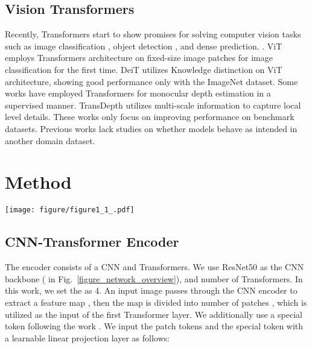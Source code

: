 \documentclass[letterpaper]{article} \usepackage{aaai23}  \usepackage{times}  \usepackage{helvet}  \usepackage{courier}  \usepackage[hyphens]{url}  \usepackage{graphicx} \urlstyle{rm} \def\UrlFont{\rm}  \usepackage{natbib}  \usepackage{caption} \frenchspacing  \setlength{\pdfpagewidth}{8.5in} \setlength{\pdfpageheight}{11in} \usepackage{algorithm}
\newcommand{\figref}[1]{Fig.~\ref{#1}}
\begin{document}
\subsection{Vision Transformers}
Recently, Transformers \cite{vaswani2017attention} start to show promises for solving computer vision tasks such as image classification \cite{dosovitskiy2020image,touvron2021training}, object detection \cite{carion2020end}, and dense prediction. \cite{zheng2021rethinking,ranftl2021vision,yang2021transformer,guizilini2022multi}. 
ViT \cite{dosovitskiy2020image} employs Transformers architecture on fixed-size image patches for image classification for the first time. DeiT \cite{touvron2021training} utilizes Knowledge distinction on ViT architecture, showing good performance only with the ImageNet dataset.
Some works \cite{ranftl2021vision,yang2021transformer} have employed Transformers for monocular depth estimation in a supervised manner. 
TransDepth \cite{yang2021transformer} utilizes multi-scale information to capture local level details.  These works \cite{zheng2021rethinking,yang2021transformer} only focus on improving performance on benchmark datasets. Previous works lack studies on whether models behave as intended in another domain dataset.


\section{Method}

\begin{figure*}[t] 
\begin{center}
\texttt{[image: figure/figure1\_1\_.pdf]}
\end{center}
\caption{\textbf{Overall Architecture.} We design an encoder-decoder structure with a multi-level feature fusion module. The encoder is composed of a CNN and Transformers. The ACM learns the channel and position attentions. The FFD adaptively fuses the encoder features using the attention maps.}
\label{figure_network_overview}
\end{figure*} 


\subsection{CNN-Transformer Encoder}
\label{sec:encoder}
The encoder consists of a CNN and Transformers. We use ResNet50 \cite{he2016deep} as the CNN backbone ( in \figref{figure_network_overview}), and  number of Transformers. In this work, we set the  as 4. 
An input image  passes through the CNN encoder to extract a feature map , then the map is divided into   number of patches , which is utilized as the input of the first Transformer layer.
We additionally use a special token  following the work \cite{ranftl2021vision}.
We input the patch tokens  and the special token  with a learnable linear projection layer  as follows:
\end{document}
